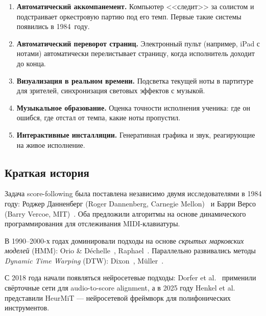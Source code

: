 \documentclass[a4paper,11pt]{article}
\newcommand{\cblue}[1]{\textcolor{accentblue}{#1}}
\begin{document}
\begin{enumerate}[leftmargin=2em]
  \item \textbf{Автоматический аккомпанемент.}
    Компьютер <<следит>> за солистом и подстраивает оркестровую партию
    под его темп. Первые такие системы появились в 1984~году.
  \item \textbf{Автоматический переворот страниц.}
    Электронный пульт (например, iPad с нотами) автоматически
    перелистывает страницу, когда исполнитель доходит до конца.
  \item \textbf{Визуализация в реальном времени.}
    Подсветка текущей ноты в партитуре для зрителей, синхронизация
    световых эффектов с музыкой.
  \item \textbf{Музыкальное образование.}
    Оценка точности исполнения ученика: где он ошибся, где отстал
    от темпа, какие ноты пропустил.
  \item \textbf{Интерактивные инсталляции.}
    Генеративная графика и звук, реагирующие на живое исполнение.
\end{enumerate}

\subsection{Краткая история}

Задача score-following была поставлена независимо двумя исследователями в 1984 году:
\cblue{Роджер Данненберг} (Roger Dannenberg, Carnegie Mellon)~\cite{dannenberg1984}
и \cblue{Барри Версо} (Barry Vercoe, MIT)~\cite{vercoe1984}. Оба предложили
алгоритмы на основе динамического программирования для отслеживания MIDI-клавиатуры.

В 1990--2000-х годах доминировали подходы на основе \emph{скрытых марковских
моделей} (HMM): Orio \& Déchelle~\cite{orio2001}, Raphael~\cite{cont2006}.
Параллельно развивались методы \emph{Dynamic Time Warping}
(DTW): Dixon~\cite{dixon2005}, Müller~\cite{muller2007}.

С 2018 года начали появляться нейросетевые подходы:
Dorfer et al.~\cite{dorfer2018} применили свёрточные сети для audio-to-score
alignment, а в 2025 году Henkel et al.~\cite{henkel2025} представили
HeurMiT --- нейросетевой фреймворк для полифонических инструментов.
\end{document}
